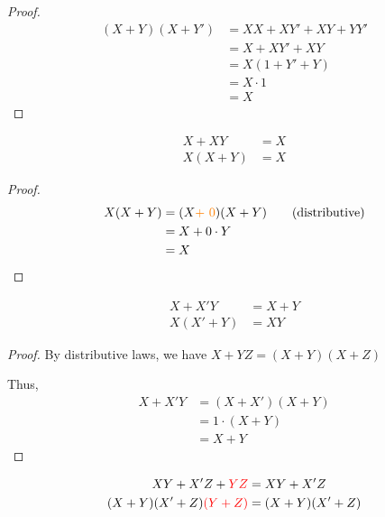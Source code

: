 \documentclass{article}
\begin{document}
\begin{proof}
    \begin{align*}
        (X + Y)(X + Y') &= XX + XY' + XY + YY' \\
        &= X + XY' + XY \\
        &= X(1 + Y' + Y) \\
        &= X \cdot 1 \\
        &= X
    \end{align*}
\end{proof}

\begin{tcolorbox}[greenbox, title=Absorption, coltitle=black]
    {
    \begin{align*}
        X + XY &= X \\
        X(X + Y) &= X
    \end{align*}
    }
\end{tcolorbox}

\begin{proof}
    \begin{align*}
        X(X + Y) &= (X \textcolor{orange}{+ \ 0})(X + Y) \qquad \text{(distributive)}\\
        &= X + 0 \cdot Y \\
        &= X
    \end{align*}
\end{proof}

\begin{tcolorbox}[greenbox, title=Elimination, coltitle=black]
    {
    \begin{align*}
        X + X'Y &= X + Y \\
        X(X' + Y) &= XY
    \end{align*}
    }
\end{tcolorbox}

\begin{proof}
By distributive laws, we have $X + YZ = (X + Y)(X + Z)$
\bigskip

Thus,
\begin{align*}
    X + X'Y &= (X + X')(X + Y) \\
    &= 1 \cdot (X + Y) \\
    &= X + Y
\end{align*}
\end{proof}

\begin{tcolorbox}[greenbox, title=Consensus, coltitle=black]
    {
    \begin{align*}
        XY + X'Z + \textcolor{red}{YZ} &= XY + X'Z \\
        (X + Y)(X' + Z)\textcolor{red}{(Y + Z)} &= (X + Y)(X' + Z)
    \end{align*}
    }
\end{tcolorbox}
\end{document}
